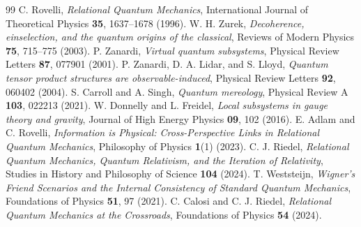\documentclass[11pt]{article}
\begin{document}
\begin{thebibliography}{99}
 C. Rovelli, \emph{Relational Quantum Mechanics}, International Journal of Theoretical Physics \textbf{35}, 1637--1678 (1996).
 W. H. Zurek, \emph{Decoherence, einselection, and the quantum origins of the classical}, Reviews of Modern Physics \textbf{75}, 715--775 (2003).
 P. Zanardi, \emph{Virtual quantum subsystems}, Physical Review Letters \textbf{87}, 077901 (2001).
 P. Zanardi, D. A. Lidar, and S. Lloyd, \emph{Quantum tensor product structures are observable-induced}, Physical Review Letters \textbf{92}, 060402 (2004).
 S. Carroll and A. Singh, \emph{Quantum mereology}, Physical Review A \textbf{103}, 022213 (2021).
 W. Donnelly and L. Freidel, \emph{Local subsystems in gauge theory and gravity}, Journal of High Energy Physics \textbf{09}, 102 (2016).
 E. Adlam and C. Rovelli, \emph{Information is Physical: Cross-Perspective Links in Relational Quantum Mechanics}, Philosophy of Physics \textbf{1}(1) (2023).
 C. J. Riedel, \emph{Relational Quantum Mechanics, Quantum Relativism, and the Iteration of Relativity}, Studies in History and Philosophy of Science \textbf{104} (2024).
 T. Weststeijn, \emph{Wigner's Friend Scenarios and the Internal Consistency of Standard Quantum Mechanics}, Foundations of Physics \textbf{51}, 97 (2021).
 C. Calosi and C. J. Riedel, \emph{Relational Quantum Mechanics at the Crossroads}, Foundations of Physics \textbf{54} (2024).
\end{thebibliography}
\end{document}
